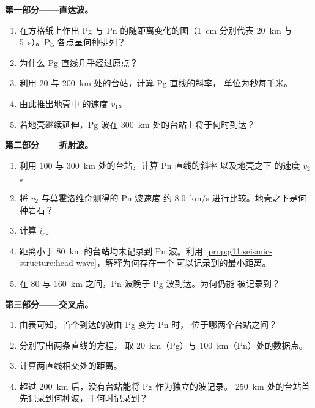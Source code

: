 \begin{problem}
\medskip
\noindent\textbf{第一部分——直达波。}
\begin{enumerate}
  \item 在方格纸上作出 Pg 与 Pn 的随距离变化的图（\qty{1}{cm}
        分别代表 \qty{20}{km} 与 \qty{5}{s}）。Pg 各点呈何种排列？
  \item 为什么 Pg 直线几乎经过原点？
  \item 利用 20 与 \qty{200}{km} 处的台站，计算 Pg 直线的斜率，
        单位为秒每千米。
  \item 由此推出地壳中 的速度 $v_1$。
  \item 若地壳继续延伸，Pg 波在
        \qty{300}{km} 处的台站上将于何时到达？
\end{enumerate}

\medskip
\noindent\textbf{第二部分——折射波。}
\begin{enumerate}[resume]
  \item 利用 100 与 \qty{300}{km} 处的台站，计算 Pn 直线的斜率
        以及地壳之下 的速度 $v_2$。
  \item 将 $v_2$ 与莫霍洛维奇测得的 Pn 波速度
        约 \qty{8.0}{km/s} 进行比较。地壳之下是何种岩石？
  \item 计算 $i_c$。
  \item 距离小于 \qty{80}{km} 的台站均未记录到 Pn 波。利用
        \cref{prop:g11:seismic-structure:head-wave}，解释为何存在一个
        可以记录到的最小距离。
  \item 在 80 与 \qty{160}{km} 之间，Pn 波晚于 Pg 波到达。为何仍能
        被记录到？
\end{enumerate}

\medskip
\noindent\textbf{第三部分——交叉点。}
\begin{enumerate}[resume]
  \item 由表可知，首个到达的波由 Pg 变为 Pn 时，
        位于哪两个台站之间？
  \item 分别写出两条直线的方程，
        取 \qty{20}{km}（Pg）与 \qty{100}{km}（Pn）处的数据点。
  \item 计算两直线相交处的距离。
  \item 超过 \qty{200}{km} 后，没有台站能将 Pg 作为独立的波记录。
        \qty{250}{km} 处的台站首先记录到何种波，于何时记录到？
\end{enumerate}


\end{problem}

